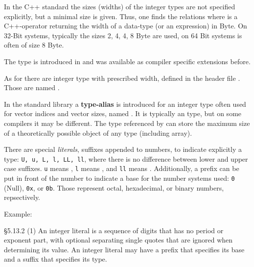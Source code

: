 In the C++ standard the sizes (widths) of the integer types are not specified explicitly, but a minimal size is given. Thus, one finds the relations
%
%
where  is a C++-operator returning the width of a data-type (or an expression) in Byte. On 32-Bit systems, typically the sizes 2, 4, 4, 8 Byte are used, on 64 Bit systems  is often of size 8 Byte.

The\marginpar{[\cxx{11}]} type  is introduced in  and was available as compiler specific extensions before.

\begin{rem}
  As\marginpar{[\cxx{11}]} for  there are integer type with prescribed width, defined in the header file . Those are named .
\end{rem}

\begin{rem}
  In the standard library a \textbf{type-alias} is introduced for an integer type often used for vector indices and vector sizes,
  named . It is typically an  type, but on some compilers it may be different. The type referenced
  by  can store the maximum size of a theoretically possible object of any type (including array).
\end{rem}

There are special \emph{literals}, suffixes appended to numbers, to indicate explicitly a type: \texttt{U, u, L, l, LL, ll}, where
there is no difference between lower and upper case suffixes. \texttt{u} means , \texttt{l} means , and \texttt{ll} means
. Additionally, a prefix can be put in front of the number to indicate a base for the number systems used: \texttt{0} (Null), \texttt{0x}, or \texttt{0b}. Those represent octal, hexadecimal, or binary numbers, repsectively.

Example:

\begin{standard}{\S 5.13.2 (1)}
  An integer literal is a sequence of digits that has no period or exponent part, with optional separating single
  quotes that are ignored when determining its value. An integer literal may have a prefix that specifies
  its base and a suffix that specifies its type.
\end{standard}


